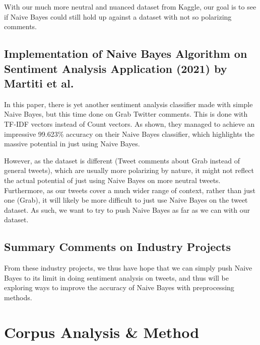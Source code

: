 \documentclass[11pt]{article}
\begin{document}
With our much more neutral and nuanced dataset from Kaggle, our goal is to see if Naive Bayes could still hold up against a dataset with not so polarizing comments.

\subsection{Implementation of Naive Bayes Algorithm on Sentiment Analysis Application (2021) by Martiti et al.}

In this paper\citep{martiti-2021}, there is yet another sentiment analysis classifier made with simple Naive Bayes, but this time done on Grab Twitter comments. This is done with TF-IDF vectors instead of Count vectors. As shown, they managed to achieve an impressive 99.623\% accuracy on their Naive Bayes classifier, which highlights the massive potential in just using Naive Bayes.

However, as the dataset is different (Tweet comments about Grab instead of general tweets), which are usually more polarizing by nature, it might not reflect the actual potential of just using Naive Bayes on more neutral tweets. Furthermore, as our tweets cover a much wider range of context, rather than just one (Grab), it will likely be more difficult to just use Naive Bayes on the tweet dataset. As such, we want to try to push Naive Bayes as far as we can with our dataset.

\subsection{Summary Comments on Industry Projects}

From these industry projects, we thus have hope that we can simply push Naive Bayes to its limit in doing sentiment analysis on tweets, and thus will be exploring ways to improve the accuracy of Naive Bayes with preprocessing methods.

\section{Corpus Analysis \& Method}
\end{document}
